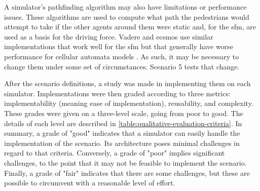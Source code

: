 \documentclass[twoside, 11pt]{article}
\begin{document}
A simulator's pathfinding algorithm may also have limitations or performance issues. These algorithms are used to compute what path the pedestrians would attempt to take if the other agents around them were static and, for the \acrlong{sfm}, are used as a basis for the driving force. Vadere and \gls{ecsmos} use similar implementations that work well for the \gls{sfm} but that generally have worse performance for cellular automata models \cite{kleinmeierVadereOpenSourceSimulation2019}. As such, it may be necessary to change them under some set of circumstances. Scenario 5 tests that change.

After the scenario definitions, a study was made in implementing them on each simulator. Implementations were then graded according to three metrics: implementability (meaning ease of implementation), reusability, and complexity. These grades were given on a three-level scale, going from poor to good. The details of each level are described in \autoref{table:qualitative-evaluation-criteria}. In summary, a grade of "good" indicates that a simulator can easily handle the implementation of the scenario. Its architecture poses minimal challenges in regard to that criteria. Conversely, a grade of "poor" implies significant challenges, to the point that it may not be feasible to implement the scenario. Finally, a grade of "fair" indicates that there are some challenges, but these are possible to circumvent with a reasonable level of effort.
\end{document}
